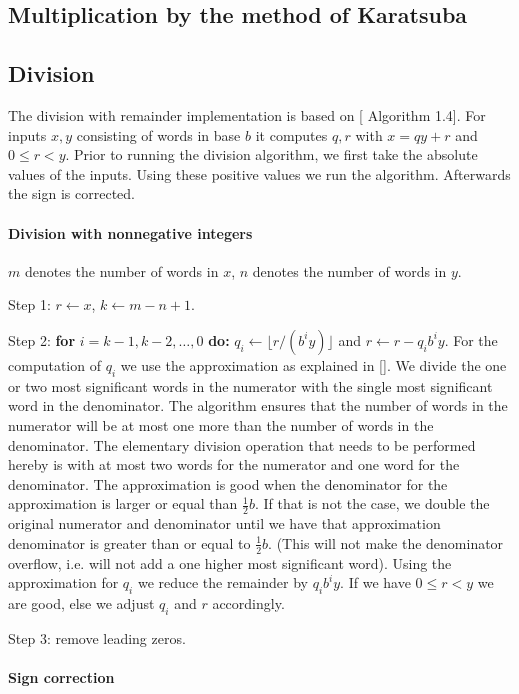 \documentclass[a4paper]{article}
\begin{document}
\subsection{Multiplication by the method of Karatsuba}

\subsection{Division}

The division with remainder implementation is based on [\cite{ant} Algorithm 1.4].
For inputs $x, y$ consisting of words in base $b$ it computes $q, r$ with $x=qy+r$ and $0 \le r < y$.
Prior to running the division algorithm, we first take the absolute values of the inputs.
Using these positive values we run the algorithm.
Afterwards the sign is corrected.

\paragraph{Division with nonnegative integers}
$m$ denotes the number of words in $x$, $n$ denotes the number of words in $y$.

Step 1: $r \gets x$, $k \gets m - n + 1$.

Step 2: \textbf{for} $i = k-1, k-2, \ldots, 0$ \textbf{do:}
$q_i \gets \lfloor r / (b^i y) \rfloor$ and $r \gets r - q_i b^i y$.
For the computation of $q_i$ we use the approximation as explained in [\cite{ant}].
We divide the one or two most significant words in the numerator with the single most significant word in the denominator. The algorithm ensures that the number of words in the numerator will be at most one more than the number of words in the denominator.
The elementary division operation that needs to be performed hereby is with at most two words for the numerator and one word for the denominator.
The approximation is good when the denominator for the approximation is larger or equal than $\frac{1}{2} b$. If that is not the case, we double the original numerator and denominator until we have that approximation denominator is greater than or equal to $\frac{1}{2} b$. (This will not make the denominator overflow, i.e. will not add a one higher most significant word).
Using the approximation for $q_i$ we reduce the remainder by $q_i b^i y$.
If we have $0 \le r < y$ we are good, else we adjust $q_i$ and $r$ accordingly.

Step 3: remove leading zeros.


\paragraph{Sign correction}
\end{document}
